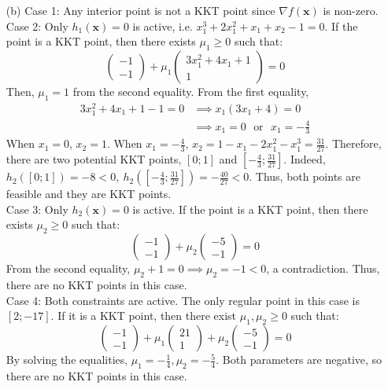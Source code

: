 \documentclass{article}
\begin{document}
\begin{itemize}
\item[(b)]
Case 1: Any interior point is not a KKT point since $\nabla f(\mathbf{x})$ is non-zero.\\
Case 2: Only $h_1(\mathbf{x})= 0$ is active, i.e. $x_1^3+2x_1^2+x_1+x_2-1=0$. If the point is a KKT point, then there exists $\mu_1\geq0$ such that:\[
\begin{pmatrix} -1\\-1\end{pmatrix} +\mu_1\begin{pmatrix}3x_1^2+4x_1+1\\1\end{pmatrix} = 0
\]
Then, $\mu_1 =1 $ from the second equality. From the first equality, \begin{align*}
    3x_1^2 + 4x_1 + 1 -1 = 0 &\implies x_1(3x_1+4)= 0\\
    &\implies x_1 = 0 \ \ \ \text{or} \ \ \ x_1 = -\frac43
\end{align*}
When $x_1=0$, $x_2=1$. When $x_1 = -\frac43$, $x_2 = 1 - x_1 -2x_1^2-x_1^3 = \frac{31}{27}$.
Therefore, there are two potential KKT points, $[0;1]$ and $[-\frac43;\frac{31}{27}]$. Indeed, $h_2([0;1])=-8<0, \  h_2([-\frac43;\frac{31}{27}])=-\frac{40}{27}<0$. Thus, both points are feasible and they are KKT points. \\

Case 3: Only $h_2(\mathbf{x}) = 0$ is active. If the point is a KKT point, then there exists $\mu_2\geq0$ such that:\[
\begin{pmatrix} -1\\-1\end{pmatrix} +\mu_2\begin{pmatrix}-5\\-1\end{pmatrix} = 0 \]
From the second equality, $\mu_2 + 1 = 0 \implies \mu_2 = -1<0$, a contradiction. Thus, there are no KKT points in this case.\\

Case 4: Both constraints are active. The only regular point in this case is $[2;-17]$. If it is a KKT point, then there exist $\mu_1, \mu_2\geq 0$ such that: \[
\begin{pmatrix} -1\\-1\end{pmatrix} +\mu_1\begin{pmatrix}21\\1\end{pmatrix} + \mu_2\begin{pmatrix}-5\\-1\end{pmatrix} = 0
\]
By solving the equalities, $\mu_1 = -\frac14, \mu_2 = -\frac54.$ Both parameters are negative, so there are no KKT points in this case. \\


\end{itemize}
\end{document}
